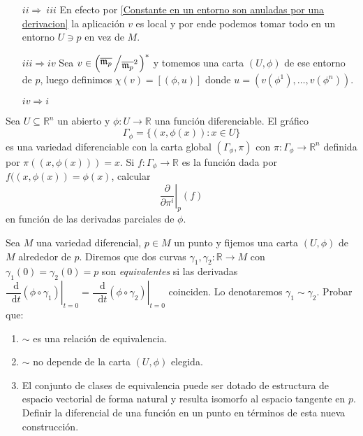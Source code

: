 \documentclass[11pt]{article}
\newcommand{\R}{{\mathbb{R}}}
\newcommand{\dual}[1]{\left(#1\right)^{\ast}}
\newcommand*\diff{\mathop{}\!\mathrm{d}}
\newcommand{\quotient}[2]{{\raisebox{.2em}{$#1$}\left/\raisebox{-.2em}{$#2$}\right.}}
\numberwithin{theorem}{subsection}
\begin{document}
\begin{solution}
\begin{enumerate}
			\item [$ii \Longrightarrow \ iii$] En efecto por \ref{Constante en un entorno son anuladas por una derivacion} la aplicaci\'on $v$ es local y por ende podemos tomar todo en un entorno $U \ni p$ en vez de $M$.
			
			\item [$iii \Longrightarrow iv$] Sea $v \in \dual{\quotient{\overline{\mathfrak{m}_p}}{\overline{\mathfrak{m}_p}^2}}$ y tomemos una carta $(U,\phi)$ de ese entorno de $p$, luego definimos $\chi(v) = [(\phi,u)]$ donde $u = \left(v(\phi^1), \dots , v(\phi^n)\right)$.
			
			\item[$iv \Longrightarrow i$] 
			
		\end{enumerate}

\end{solution}

\begin{question}
	Sea $U\subseteq\R^n$ un abierto y $\phi:U\to\R$ una funci\'on diferenciable. El gr\'afico $$\Gamma_\phi=\{(x,\phi(x)):x\in U\}$$ es una variedad diferenciable con la carta global $(\Gamma_\phi,\pi)$ con $\pi:\Gamma_\phi\to\R^n$ definida por $\pi((x,\phi(x)))=x$. Si $f:\Gamma_\phi\to\R$ es la funci\'on dada por $f((x,\phi(x))=\phi(x)$, calcular $$\left.\dfrac{\partial}{\partial \pi^i}\right|_p (f)$$ en funci\'on de las derivadas parciales de $\phi$.
\end{question}

\begin{question}
	Sea $M$ una variedad diferencial, $p\in M$ un punto y fijemos una carta $(U,\phi)$ de $M$ alrededor de $p$. Diremos que dos curvas $\gamma_1,\gamma_2:\R\to M$ con $\gamma_1(0)=\gamma_2(0)=p$ son \textit{equivalentes} si las derivadas $\left.\dfrac{\diff}{\diff t}(\phi\circ\gamma_1)\right|_{t=0}=\left.\dfrac{\diff}{\diff t}(\phi\circ\gamma_2)\right|_{t=0}$ coinciden. Lo denotaremos $\gamma_1\sim\gamma_2$. Probar que:
	\begin{enumerate}
		\item $\sim$ es una relaci\'on de equivalencia.
		\item $\sim$ no depende de la carta $(U,\phi)$ elegida.
		\item El conjunto de clases de equivalencia puede ser dotado de estructura de espacio vectorial de forma natural y resulta isomorfo al espacio tangente en $p$. Definir la diferencial de una funci\'on en un punto en t\'erminos de esta nueva construcci\'on.
	\end{enumerate}
\end{question}
\end{document}
